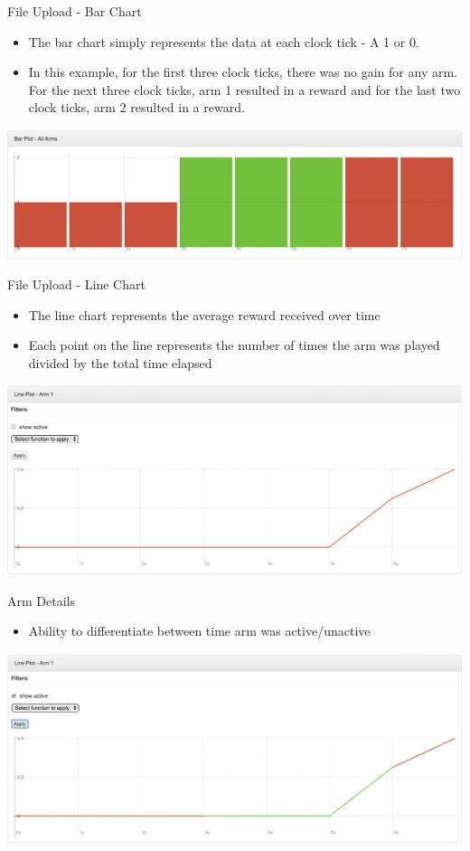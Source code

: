 \documentclass{beamer}
\begin{document}
\begin{frame}{File Upload - Bar Chart}
\begin{itemize}
\item The bar chart simply represents the data at each clock tick - A 1 or 0. 
\item In this example, for the first three clock ticks, there was no gain for any arm. For the next three clock ticks, arm 1 resulted in a reward and for the last two clock ticks, arm 2 resulted in a reward.
\end{itemize}
\includegraphics[scale=0.25]{barchart.png}
\end{frame}

\begin{frame}{File Upload - Line Chart}
\begin{itemize}
\item The line chart represents the average reward received over time
\item Each point on the line represents the number of times the arm was played divided by the total time elapsed
\end{itemize}
\includegraphics[scale=0.25]{linechart.png}
\end{frame}

\begin{frame}{Arm Details}
\begin{itemize}
\item Ability to differentiate between time arm was active/unactive
\end{itemize}
\includegraphics[scale=0.25]{linechartactive.png}
\end{frame}
\end{document}
